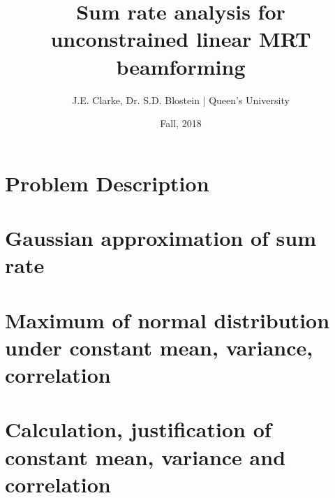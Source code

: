 \documentclass[11pt]{article}
\title{Sum rate analysis for unconstrained linear MRT beamforming}
\author{J.E. Clarke, Dr. S.D. Blostein | Queen's University}
\date{Fall, 2018}
\begin{document}
	\maketitle
	\newpage
	\section{Problem Description}
	    
	\section{Gaussian approximation of sum rate}
	    
	\section{Maximum of normal distribution under constant mean, variance, correlation}
	    
	\section{Calculation, justification of constant mean, variance and correlation}
	    
    \newpage	
 	\begingroup
 		\renewcommand{\section}[2]{}%
 		
 		
 	\endgroup
\end{document}
